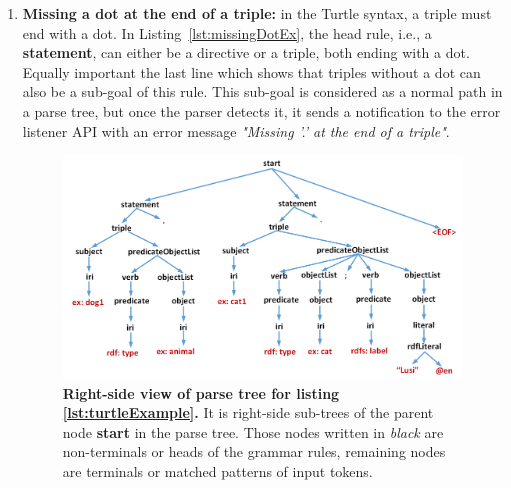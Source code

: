 \begin{enumerate}
    \item \textbf{Missing a dot at the end of a triple:} in the Turtle syntax, a triple must end with a dot. 
    In Listing~\ref{lst:missingDotEx}, the head rule, i.e., a \textbf{statement}, can either be a directive or a triple, both ending with a dot. 
    Equally important the last line which shows that triples without a dot can also be a sub-goal of this rule. 
    This sub-goal is considered as a normal path in a parse tree, but once the parser detects it, it sends a notification to the error listener API with an error message \emph{"Missing ’.’ at the end of a triple"}.  
    \begin{figure}
		\includegraphics[width=1\linewidth]{images/implementationParseTreeRight.png}
	\caption{\textbf{Right-side view of parse tree  for listing \ref{lst:turtleExample}.} It is right-side sub-trees of the parent node \textbf{start} in the parse tree. Those nodes written in \emph{black} are non-terminals or heads of the grammar rules, remaining nodes are terminals or matched patterns of input tokens.}
	\label{Fig:implementationParseTreeRight}

\end{figure}
    

\end{enumerate}
